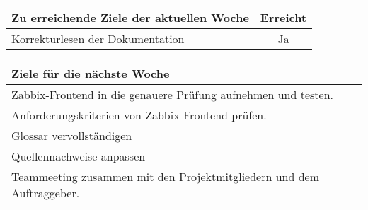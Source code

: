\begin{tabularx}{\textwidth}{Xc}
    \arrayrulecolor{OliveGreen}
    \toprule
    {\bfseries Zu erreichende Ziele der aktuellen Woche} & {\bfseries Erreicht} \\
    \midrule[2pt]
    Korrekturlesen der Dokumentation                        &Ja              \\
    \bottomrule[2pt]
\end{tabularx}
%
\vspace{1cm}
%
\begin{tabularx}{\textwidth}{Xc}
    \arrayrulecolor{OliveGreen}
    \toprule
    {\bfseries Ziele für die nächste Woche}        &                         \\
    \midrule[2pt]
    Zabbix\hyp{}Frontend in die genauere Prüfung aufnehmen und testen.  &    \\
    \rowcolor{OliveGreen!15}
    Anforderungskriterien von Zabbix\hyp{}Frontend prüfen.        &           \\
    \rowcolor{White}
    Glossar vervollständigen                       &                         \\
    \rowcolor{OliveGreen!15}
    Quellennachweise anpassen                      &                         \\
    \rowcolor{White}
    Teammeeting zusammen mit den Projektmitgliedern und dem Auftraggeber.  &  \\
\end{tabularx}
